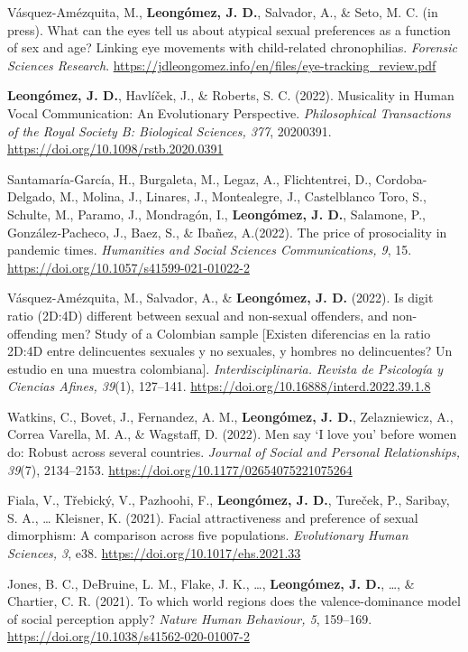 \documentclass[11pt,a4paper,]{awesome-cv}
\begin{document}
\begingroup
\setlength{\parindent}{-0.5in}
\setlength{\leftskip}{0.5in}

Vásquez-Amézquita, M., \textbf{Leongómez, J. D.}, Salvador, A., \& Seto,
M. C. (in press). What can the eyes tell us about atypical sexual
preferences as a function of sex and age? Linking eye movements with
child-related chronophilias. \emph{Forensic Sciences Research}.
\url{https://jdleongomez.info/en/files/eye-tracking_review.pdf}

\textbf{Leongómez, J. D.}, Havlíček, J., \& Roberts, S. C. (2022).
Musicality in Human Vocal Communication: An Evolutionary Perspective.
\emph{Philosophical Transactions of the Royal Society B: Biological
Sciences, 377}, 20200391. \url{https://doi.org/10.1098/rstb.2020.0391}

Santamaría-García, H., Burgaleta, M., Legaz, A., Flichtentrei, D.,
Cordoba-Delgado, M., Molina, J., Linares, J., Montealegre, J.,
Castelblanco Toro, S., Schulte, M., Paramo, J., Mondragón, I.,
\textbf{Leongómez, J. D.}, Salamone, P., González‑Pacheco, J., Baez, S.,
\& Ibañez, A.(2022). The price of prosociality in pandemic times.
\emph{Humanities and Social Sciences Communications, 9}, 15.
\url{https://doi.org/10.1057/s41599-021-01022-2}

Vásquez-Amézquita, M., Salvador, A., \& \textbf{Leongómez, J. D.}
(2022). Is digit ratio (2D:4D) different between sexual and non-sexual
offenders, and non-offending men? Study of a Colombian sample {[}Existen
diferencias en la ratio 2D:4D entre delincuentes sexuales y no sexuales,
y hombres no delincuentes? Un estudio en una muestra colombiana{]}.
\emph{Interdisciplinaria. Revista de Psicología y Ciencias Afines,
39}(1), 127--141. \url{https://doi.org/10.16888/interd.2022.39.1.8}

Watkins, C., Bovet, J., Fernandez, A. M., \textbf{Leongómez, J. D.},
Zelazniewicz, A., Correa Varella, M. A., \& Wagstaff, D. (2022). Men say
`I love you' before women do: Robust across several countries.
\emph{Journal of Social and Personal Relationships, 39}(7), 2134--2153.
\url{https://doi.org/10.1177/02654075221075264}

Fiala, V., Třebický, V., Pazhoohi, F., \textbf{Leongómez, J. D.},
Tureček, P., Saribay, S. A., \ldots{} Kleisner, K. (2021). Facial
attractiveness and preference of sexual dimorphism: A comparison across
five populations. \emph{Evolutionary Human Sciences, 3}, e38.
\url{https://doi.org/10.1017/ehs.2021.33}

Jones, B. C., DeBruine, L. M., Flake, J. K., \ldots,
\textbf{Leongómez, J. D.}, \ldots, \& Chartier, C. R. (2021). To which
world regions does the valence-dominance model of social perception
apply? \emph{Nature Human Behaviour, 5}, 159--169.
\url{https://doi.org/10.1038/s41562-020-01007-2}
\end{document}

